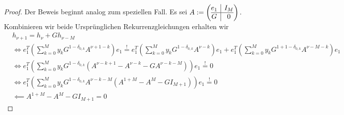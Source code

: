 \documentclass{article}
\theoremstyle{plain} %
\theoremstyle{definition} %
\newtheorem{proof}[theorem]{Beweis}
\begin{document}
\begin{proof}
  Der Beweis beginnt analog zum speziellen Fall.
  Es sei $A := \left( \begin{array}{@{}c|c@{}}
        e_1 & I_M \\
        \hline
        G   & 0
      \end{array}\right).$ Kombinieren wir beide Ursprünglichen Rekurrenzgleichungen erhalten wir \begin{align}
     & h_{\nu+1}                                                                                                                                                                                                                                                      =              h_\nu + Gh_{\nu-M}                    \\
     & \iff e_1^T (\sum_{k=0}^{M} y_k G^{1-\delta_{0,k}} A^{\nu + 1 - k}) e_1                                      \overset{!}{=} e_1^T (\sum_{k=0}^{M} y_k G^{1-\delta_{0,k}} A^{\nu-k}) e_1 + e_1^T (\sum_{k=0}^{M} y_k G^{1 + 1-\delta_{0,k}} A^{\nu - M - k}) e_1                                                      \\
     & \iff e_1^T ( \sum_{k=0}^{M} y_k G^{1-\delta_{0,k}} (A^{\nu - k + 1} - A^{\nu - k} - GA^{\nu - k - M}) ) e_1                                                                                                                                                                                       \overset{!}{=}  0 \\
     & \iff e_1^T ( \sum_{k=0}^{M} y_k G^{1-\delta_{0,k}} A^{\nu - k - M} (A^{1 + M} - A^{M} - G I_{M+1}) ) e_1                                                                                                                                                                                         \overset{!}{=}  0  \\
     & \impliedby A^{1 + M} - A^{M} - G I_{M+1} = 0 \label{rabbit3}
  \end{align}


\end{proof}
\end{document}
